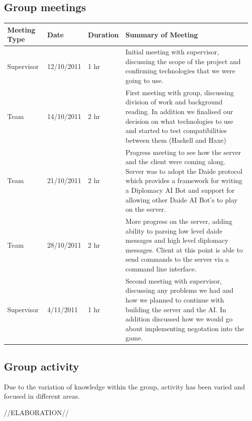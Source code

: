 \documentclass[12pt]{article}
\begin{document}
\subsection{Group meetings}
\begin{center}
    \begin{tabular}{ | l | l | l | p{8cm} |}
    \hline
    Meeting Type       & Date          & Duration   & Summary of Meeting \\ \hline

    Supervisor         & 12/10/2011    & 1 hr       & Initial meeting with supervisor, discussing the scope of the project and confirming technologies that we were going to use. \\ \hline
    Team               & 14/10/2011    & 2 hr       & First meeting with group, discussing division of work and background reading. In addition we finalised our decision on what technologies to use and started to test compatibilities between them (Haskell and Haxe) \\ \hline
    Team               & 21/10/2011    & 2 hr       & Progress meeting to see how the server and the client were coming along. Server was to adopt the Daide protocol which provides a framework for writing a Diplomacy AI Bot and support for allowing other Daide AI Bot's to play on the server.  \\ \hline
    Team               & 28/10/2011    & 2 hr       & More progress on the server, adding ability to parsing low level daide messages and high level diplomacy messages. Client at this point is able to send commands to the server via a command line interface.  \\ \hline
    Supervisor               & 4/11/2011     & 1 hr       & Second meeting with supervisor, discussing any problems we had and how we planned to continue with building the server and the AI. In addition discussed how we would go about implementing negotation into the game.  \\ \hline

    \end{tabular}
\end{center}

\subsection{Group activity}
Due to the variation of knowledge within the group, activity has been varied and focused in different areas. 

//ELABORATION//
\end{document}
